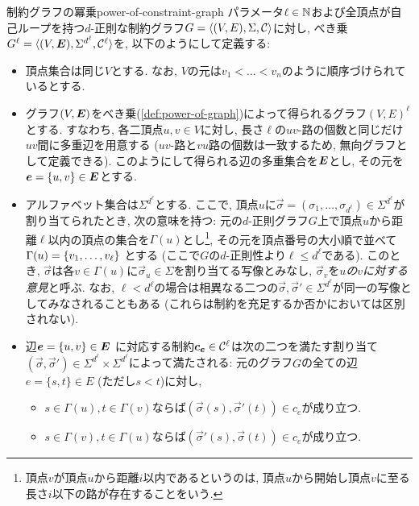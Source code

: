 \begin{definition}{制約グラフの冪乗}{power-of-constraint-graph}
  パラメータ$\ell\in\mathbb{N}$および全頂点が自己ループを持つ$d$-正則な制約グラフ$G=\langle(V,E),\Sigma,\mathcal{C}\rangle$に対し, べき乗$G^\ell = \langle(V,\boldsymbol{E}),\Sigma^{d^{\ell}},\mathcal{C}^\ell\rangle$を, 以下のようにして定義する:
  \begin{itemize}
    \item 頂点集合は同じ$V$とする. なお, $V$の元は$v_1<\dots < v_n$のように順序づけられているとする.
    \item グラフ$(V,\boldsymbol{E})$をべき乗(\cref{def:power-of-graph})によって得られるグラフ$(V,E)^\ell$とする. すなわち, 各二頂点$u,v\in V$に対し, 長さ$\ell$の$uv$-路の個数と同じだけ$uv$間に多重辺を用意する ($uv$-路と$vu$路の個数は一致するため, 無向グラフとして定義できる). このようにして得られる辺の多重集合を$\boldsymbol{E}$とし, その元を$\boldsymbol{e} = \{u,v\} \in \boldsymbol{E}$とする.
    \item アルファベット集合は$\Sigma^{d^{\ell}}$とする. ここで, 頂点$u$に$\vec{\sigma}=(\sigma_1,\dots,\sigma_{d^{\ell}}) \in \Sigma^{d^{\ell}}$が割り当てられたとき, 次の意味を持つ: 元の$d$-正則グラフ$G$上で頂点$u$から距離$\ell$以内の頂点の集合を$\Gamma(u)$とし\footnote{頂点$v$が頂点$u$から距離$i$以内であるというのは, 頂点$u$から開始し頂点$v$に至る長さ$i$以下の路が存在することをいう.}, その元を頂点番号の大小順で並べて$\Gamma(u)=\qty{ v_1,\dots,v_\ell}$ とする (ここで$G$の$d$-正則性より$\ell \le d^{\ell}$である). このとき, $\vec{\sigma}$は各$v\in\Gamma(u)$に$\vec{\sigma}_u\in \Sigma$を割り当てる写像とみなし, $\vec{\sigma}_v$を\emph{$u$の$v$に対する意見}と呼ぶ.
    なお, $\ell < d^{\ell}$の場合は相異なる二つの$\vec{\sigma},\vec{\sigma}'\in\Sigma^{d^{\ell}}$が同一の写像としてみなされることもある (これらは制約を充足するか否かにおいては区別されない).
    \item 辺$\boldsymbol{e} = \{u,v\} \in \boldsymbol{E}$ に対応する制約$\boldsymbol{c}_{\boldsymbol{e}}\in \mathcal{C}^\ell$は次の二つを満たす割り当て$(\vec{\sigma},\vec{\sigma}')\in \Sigma^{d^{\ell}} \times \Sigma^{d^{\ell}}$によって満たされる:
    元のグラフ$G$の全ての辺$e=\{s,t\}\in E$ (ただし$s<t$)に対し,
      \begin{itemize}
        \item $s\in \Gamma(u), t\in\Gamma(v)$ならば$(\vec{\sigma}(s), \vec{\sigma}'(t))\in c_e$が成り立つ.
        \item $s\in\Gamma(v), t\in\Gamma(u)$ならば$(\vec{\sigma}'(s), \vec{\sigma}(t))\in c_e$が成り立つ.
      \end{itemize}
  \end{itemize}
\end{definition}

